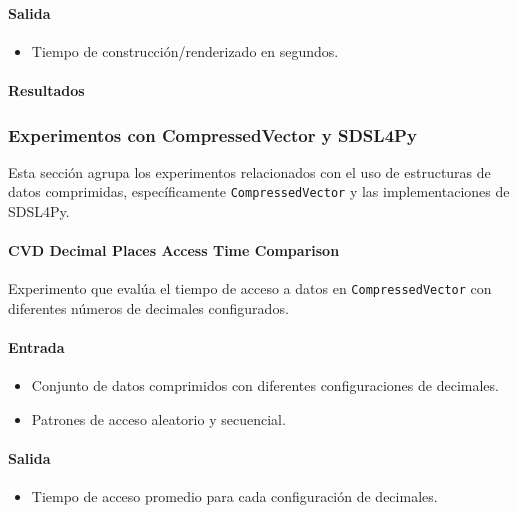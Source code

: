 \paragraph{Salida}
\begin{itemize}
    \item Tiempo de construcción/renderizado en segundos.
\end{itemize}

\paragraph{Resultados}
\vspace{0.5em}
\noindent

\BuildingTimeComparison

\subsubsection{Experimentos con CompressedVector y SDSL4Py}
\label{anexo_sdsl4py}

Esta sección agrupa los experimentos relacionados con el uso de estructuras de datos comprimidas, específicamente \texttt{CompressedVector} y las implementaciones de SDSL4Py.

\paragraph{CVD Decimal Places Access Time Comparison}
\label{cvd_decimal_places_access_time}

Experimento que evalúa el tiempo de acceso a datos en \texttt{CompressedVector} con diferentes números de decimales configurados.

\paragraph{Entrada}
\begin{itemize}
    \item Conjunto de datos comprimidos con diferentes configuraciones de decimales.
    \item Patrones de acceso aleatorio y secuencial.
\end{itemize}

\paragraph{Salida}
\begin{itemize}
    \item Tiempo de acceso promedio para cada configuración de decimales.
\end{itemize}


